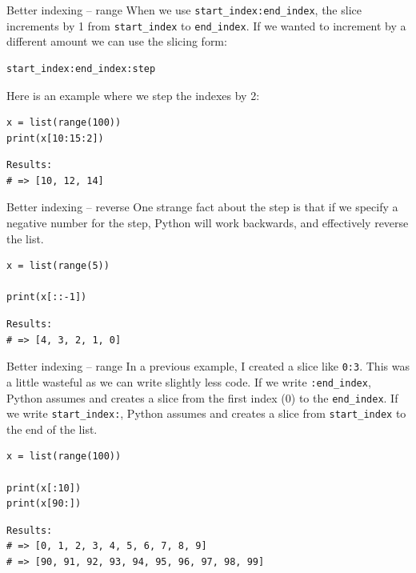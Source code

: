 \documentclass[10pt]{beamer}
\begin{document}
\begin{frame}[label={sec:orgd0c14bc},fragile]{Better indexing -- range}
 When we use \texttt{start\_index:end\_index}, the slice increments by 1 from \texttt{start\_index} to
\texttt{end\_index}. If we wanted to increment by a different amount we can use the slicing
form:

\begin{verbatim}
start_index:end_index:step
\end{verbatim}

Here is an example where we step the indexes by 2:

\begin{verbatim}
x = list(range(100))
print(x[10:15:2])
\end{verbatim}

\begin{verbatim}
Results: 
# => [10, 12, 14]
\end{verbatim}
\end{frame}

\begin{frame}[label={sec:orgf7fd850},fragile]{Better indexing -- reverse}
 One strange fact about the step is that if we specify a negative number for the step,
Python will work backwards, and effectively reverse the list.

\begin{verbatim}
x = list(range(5))

print(x[::-1])
\end{verbatim}

\begin{verbatim}
Results: 
# => [4, 3, 2, 1, 0]
\end{verbatim}
\end{frame}

\begin{frame}[label={sec:org84b8a18},fragile]{Better indexing -- range}
 In a previous example, I created a slice like \texttt{0:3}. This was a little wasteful as we
can write slightly less code. If we write \texttt{:end\_index}, Python assumes and creates a
slice from the first index (0) to the \texttt{end\_index}. If we write \texttt{start\_index:}, Python
assumes and creates a slice from \texttt{start\_index} to the end of the list.

\begin{verbatim}
x = list(range(100))

print(x[:10])
print(x[90:])
\end{verbatim}

\begin{verbatim}
Results: 
# => [0, 1, 2, 3, 4, 5, 6, 7, 8, 9]
# => [90, 91, 92, 93, 94, 95, 96, 97, 98, 99]
\end{verbatim}
\end{frame}
\end{document}
